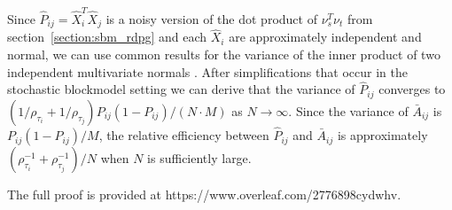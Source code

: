 \documentclass[a4paper]{article}
\begin{document}
Since $\hat{P}_{ij} = \hat{X}_i^T \hat{X}_j$ is a noisy version of the dot product of $\nu_s^T \nu_t$ from section~\ref{section:sbm_rdpg} and each $\hat{X}_i$ are approximately independent and normal, we can use common results for the variance of the inner product of two independent multivariate normals \citet{brown1977means}.
After simplifications that occur in the stochastic blockmodel setting we can derive that the variance of $\hat{P}_{ij}$ converges to $\left( 1/\rho_{\tau_i} + 1/\rho_{\tau_j} \right) P_{ij} (1-P_{ij})/(N \cdot M)$ as $N \rightarrow \infty$. 
Since the variance of $\bar{A}_{ij}$ is $P_{ij} (1-P_{ij})/M$, the relative efficiency between $\hat{P}_{ij}$ and $\bar{A}_{ij}$ is approximately $(\rho_{\tau_i}^{-1} + \rho_{\tau_j}^{-1})/N$ when $N$ is sufficiently large.
	
The full proof is provided at https://www.overleaf.com/2776898cydwhv. 


% 
\end{document}

